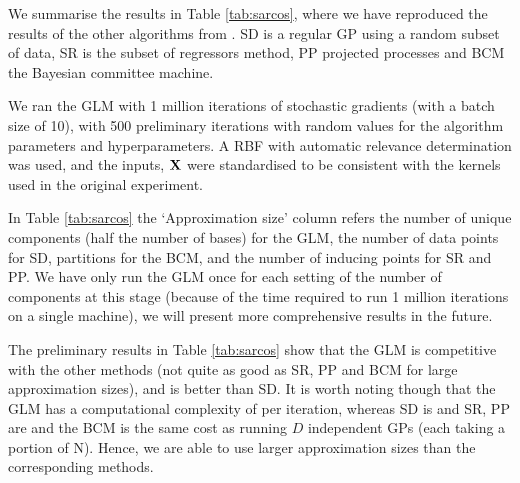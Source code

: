 \documentclass[11pt, oneside]{article}
\begin{document}
We summarise the results in Table \ref{tab:sarcos}, where we have reproduced
the results of the other algorithms from \citet{Rasmussen2006}. SD is a regular
GP using a random subset of data, SR is the subset of regressors method, PP
projected processes and BCM the Bayesian committee machine.

We ran the GLM with 1 million iterations of stochastic gradients (with a batch
size of 10), with 500 preliminary iterations with random values for the
algorithm parameters and hyperparameters. A RBF with automatic relevance
determination was used, and the inputs, $\mathbf{X}$ were standardised to be
consistent with the kernels used in the original experiment.

In Table \ref{tab:sarcos} the `Approximation size' column refers the number of
unique components (half the number of bases) for the GLM, the number of data
points for SD, partitions for the BCM, and the number of inducing points for SR
and PP. We have only run the GLM once for each setting of the number of
components at this stage (because of the time required to run 1 million 
iterations on a single machine), we will present more comprehensive results in
the future.

The preliminary results in Table \ref{tab:sarcos} show that the GLM is
competitive with the other methods (not quite as good as SR, PP and BCM for
large approximation sizes), and is better than SD. It is worth noting though
that the GLM has a computational complexity of  per iteration, whereas
SD is  and SR, PP are  and the BCM is the same cost as
running $D$ independent GPs (each taking a portion of N). Hence, we are able to
use larger approximation sizes than the corresponding methods.


\end{document}
